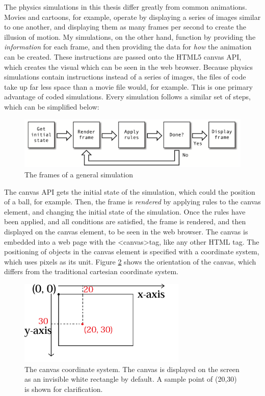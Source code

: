 The physics simulations in this thesis differ greatly from common animations.  Movies and cartoons, for example, operate by displaying a series of images similar to one another, and displaying them as many frames per second to create the illusion of motion.  My simulations, on the other hand, function by providing the \textit{information} for each frame, and then providing the data for \textit{how} the animation can be created.  These instructions are passed onto the HTML5 canvas API, which creates the visual which can be seen in the web browser.  Because physics simulations contain instructions instead of a series of images, the files of code take up far less space than a movie file would, for example.  This is one primary advantage of coded simulations.  Every simulation follows a similar set of steps, which can be simplified below: 

\begin{figure}[h] 
	\centering
		\includegraphics[width=15cm]{Figures/frames.png}

	\caption{The frames of a general simulation}
	\label{fig:frames}
\end{figure}


The canvas API gets the initial state of the simulation, which could the position of a ball, for example.  Then, the frame is \textit{rendered} by applying rules to the canvas element, and changing the initial state of the simulation.  Once the rules have been applied, and all conditions are satisfied, the frame is rendered, and then displayed on the canvas element, to be seen in the web browser.  The canvas is embedded into a web page with the \textless canvas\textgreater tag, like any other HTML tag.  The positioning of objects in the canvas element is specified with a coordinate system, which uses pixels as its unit.  Figure \ref{fig:canvas} shows the orientation of the canvas, which differs from the traditional cartesian coordinate system.

\begin{figure}[h] 
	\centering
		\includegraphics[width=8cm]{Figures/canvas.png}

	\caption{The canvas coordinate system.  The canvas is displayed on the screen as an invisible white rectangle by default.  A sample point of (20,30) is shown for clarification.}
	\label{fig:canvas}
\end{figure}



